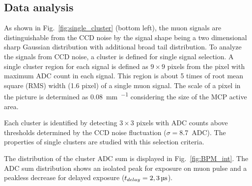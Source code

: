 \documentclass[preprint,3p,twocolumn]{elsarticle}
\begin{document}
\subsection{Data analysis}

As shown in Fig.~\ref{fig:single_cluster} (bottom left), the muon signals are distinguishable from the CCD noise by the signal shape being a two dimensional sharp Gaussian distribution with additional broad tail distribution. 
To analyze the signals from CCD noise, a cluster is defined for single signal selection. A single cluster region for each signal is defined as $9 \times 9$ pixels from the pixel with maximum ADC count in each signal. This region is about 5 times of root mean square (RMS) width (1.6 pixel) of a single muon signal. The scale of a pixel in the picture is determined as \SI{0.08}{\mm \per \pixel} considering the size of the MCP active area.

Each cluster is identified by detecting $3 \times 3$ pixels with ADC counts above thresholds determined by the CCD noise fluctuation ($\sigma=$\SI{8.7}{ADC}). The properties of single clusters are studied with this selection criteria.

The distribution of the cluster ADC sum is displayed in Fig.~\ref{fig:BPM_int}.
The ADC sum distribution shows an isolated peak for exposure on muon pulse and a peakless decrease for delayed exposure ($t_{delay} = \SIlist[list-pair-separator = {, }, list-units = single]{2; 3}{\micro\s}$).
\end{document}
